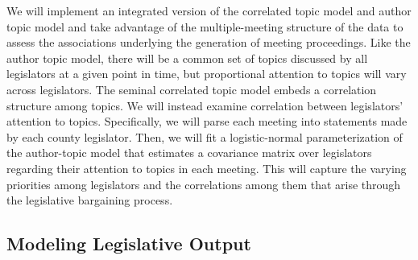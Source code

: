 We will implement an integrated version of the correlated topic model \cite{Blei2005} and author topic model \cite{Steyvers2004} and take advantage of the multiple-meeting structure of the data to assess the associations underlying the generation of meeting proceedings. Like the author topic model,  there will be a common set of topics discussed by all legislators at a given point in time, but proportional attention to topics will vary across legislators. The seminal correlated topic model embeds a correlation structure among topics. We will instead examine correlation between legislators' attention to topics. Specifically, we will parse each meeting into statements made by each county legislator. Then, we will fit a logistic-normal parameterization of the author-topic model that estimates a covariance matrix over legislators regarding their attention to topics in each meeting. This will capture the varying priorities among legislators and the correlations among them that arise through the legislative bargaining process.

\subsection{Modeling Legislative Output}

